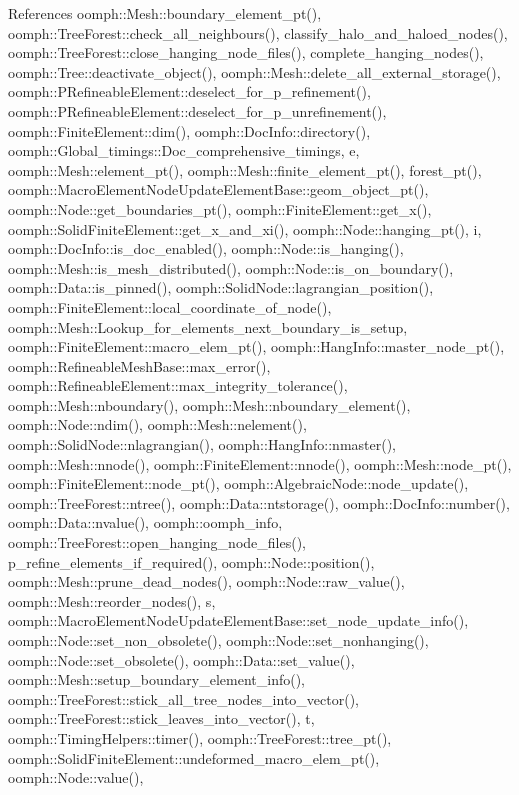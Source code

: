 References oomph\+::\+Mesh\+::boundary\+\_\+element\+\_\+pt(), oomph\+::\+Tree\+Forest\+::check\+\_\+all\+\_\+neighbours(), classify\+\_\+halo\+\_\+and\+\_\+haloed\+\_\+nodes(), oomph\+::\+Tree\+Forest\+::close\+\_\+hanging\+\_\+node\+\_\+files(), complete\+\_\+hanging\+\_\+nodes(), oomph\+::\+Tree\+::deactivate\+\_\+object(), oomph\+::\+Mesh\+::delete\+\_\+all\+\_\+external\+\_\+storage(), oomph\+::\+P\+Refineable\+Element\+::deselect\+\_\+for\+\_\+p\+\_\+refinement(), oomph\+::\+P\+Refineable\+Element\+::deselect\+\_\+for\+\_\+p\+\_\+unrefinement(), oomph\+::\+Finite\+Element\+::dim(), oomph\+::\+Doc\+Info\+::directory(), oomph\+::\+Global\+\_\+timings\+::\+Doc\+\_\+comprehensive\+\_\+timings, e, oomph\+::\+Mesh\+::element\+\_\+pt(), oomph\+::\+Mesh\+::finite\+\_\+element\+\_\+pt(), forest\+\_\+pt(), oomph\+::\+Macro\+Element\+Node\+Update\+Element\+Base\+::geom\+\_\+object\+\_\+pt(), oomph\+::\+Node\+::get\+\_\+boundaries\+\_\+pt(), oomph\+::\+Finite\+Element\+::get\+\_\+x(), oomph\+::\+Solid\+Finite\+Element\+::get\+\_\+x\+\_\+and\+\_\+xi(), oomph\+::\+Node\+::hanging\+\_\+pt(), i, oomph\+::\+Doc\+Info\+::is\+\_\+doc\+\_\+enabled(), oomph\+::\+Node\+::is\+\_\+hanging(), oomph\+::\+Mesh\+::is\+\_\+mesh\+\_\+distributed(), oomph\+::\+Node\+::is\+\_\+on\+\_\+boundary(), oomph\+::\+Data\+::is\+\_\+pinned(), oomph\+::\+Solid\+Node\+::lagrangian\+\_\+position(), oomph\+::\+Finite\+Element\+::local\+\_\+coordinate\+\_\+of\+\_\+node(), oomph\+::\+Mesh\+::\+Lookup\+\_\+for\+\_\+elements\+\_\+next\+\_\+boundary\+\_\+is\+\_\+setup, oomph\+::\+Finite\+Element\+::macro\+\_\+elem\+\_\+pt(), oomph\+::\+Hang\+Info\+::master\+\_\+node\+\_\+pt(), oomph\+::\+Refineable\+Mesh\+Base\+::max\+\_\+error(), oomph\+::\+Refineable\+Element\+::max\+\_\+integrity\+\_\+tolerance(), oomph\+::\+Mesh\+::nboundary(), oomph\+::\+Mesh\+::nboundary\+\_\+element(), oomph\+::\+Node\+::ndim(), oomph\+::\+Mesh\+::nelement(), oomph\+::\+Solid\+Node\+::nlagrangian(), oomph\+::\+Hang\+Info\+::nmaster(), oomph\+::\+Mesh\+::nnode(), oomph\+::\+Finite\+Element\+::nnode(), oomph\+::\+Mesh\+::node\+\_\+pt(), oomph\+::\+Finite\+Element\+::node\+\_\+pt(), oomph\+::\+Algebraic\+Node\+::node\+\_\+update(), oomph\+::\+Tree\+Forest\+::ntree(), oomph\+::\+Data\+::ntstorage(), oomph\+::\+Doc\+Info\+::number(), oomph\+::\+Data\+::nvalue(), oomph\+::oomph\+\_\+info, oomph\+::\+Tree\+Forest\+::open\+\_\+hanging\+\_\+node\+\_\+files(), p\+\_\+refine\+\_\+elements\+\_\+if\+\_\+required(), oomph\+::\+Node\+::position(), oomph\+::\+Mesh\+::prune\+\_\+dead\+\_\+nodes(), oomph\+::\+Node\+::raw\+\_\+value(), oomph\+::\+Mesh\+::reorder\+\_\+nodes(), s, oomph\+::\+Macro\+Element\+Node\+Update\+Element\+Base\+::set\+\_\+node\+\_\+update\+\_\+info(), oomph\+::\+Node\+::set\+\_\+non\+\_\+obsolete(), oomph\+::\+Node\+::set\+\_\+nonhanging(), oomph\+::\+Node\+::set\+\_\+obsolete(), oomph\+::\+Data\+::set\+\_\+value(), oomph\+::\+Mesh\+::setup\+\_\+boundary\+\_\+element\+\_\+info(), oomph\+::\+Tree\+Forest\+::stick\+\_\+all\+\_\+tree\+\_\+nodes\+\_\+into\+\_\+vector(), oomph\+::\+Tree\+Forest\+::stick\+\_\+leaves\+\_\+into\+\_\+vector(), t, oomph\+::\+Timing\+Helpers\+::timer(), oomph\+::\+Tree\+Forest\+::tree\+\_\+pt(), oomph\+::\+Solid\+Finite\+Element\+::undeformed\+\_\+macro\+\_\+elem\+\_\+pt(), oomph\+::\+Node\+::value(), 